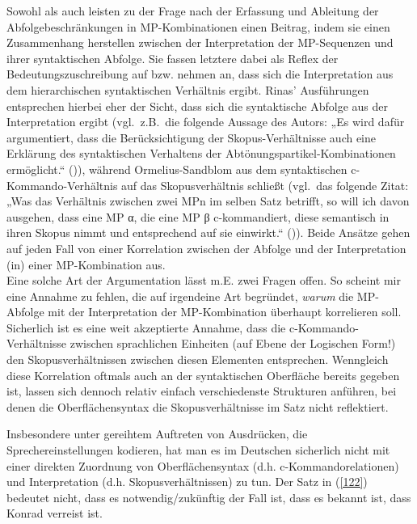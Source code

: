 \noindent 
Sowohl \citet{Ormelius-Sandblom1997} als auch \citet{Rinas2006, Rinas2007} leisten zu der Frage nach der Erfassung und Ableitung der Abfolgebeschränkungen in MP-Kom\-bi\-na\-ti\-on\-en einen Beitrag, indem sie einen Zusammenhang herstellen zwischen der Interpretation der MP-Sequenzen und ihrer syntaktischen Abfolge. Sie fassen letztere dabei als Reflex der Bedeutungszuschreibung auf bzw. nehmen an, dass sich die Interpretation aus dem hierarchischen syntaktischen Verhältnis ergibt. Rinas' Ausführungen entsprechen hierbei eher der Sicht, dass sich die syntaktische Abfolge aus der Interpretation ergibt (vgl.\ z.B.\ die folgende Aussage des Autors:  „Es wird dafür argumentiert, dass die Berücksichtigung der Skopus-Verhältnisse  auch eine Erklärung des syntaktischen Verhaltens der Abtönungs\-partikel-Kombinationen ermöglicht.“ (\citealt[408]{Rinas2007})), während Ormelius-\linebreak Sandblom aus dem syntaktischen c-Kommando-Verhältnis  auf das Skopusverhältnis schließt (vgl.\ das folgende Zitat:  „Was das Verhältnis zwischen zwei MPn im selben Satz betrifft, so will ich davon ausgehen, dass eine MP α, die eine MP β c-kommandiert, diese semantisch in ihren Skopus nimmt und entsprechend auf sie einwirkt.“ (\citealt[92--93]{Ormelius-Sandblom1997})). Beide Ansätze gehen auf jeden Fall von einer Korrelation zwischen der Abfolge und der Interpretation (in) einer MP-Kombinati\-on aus.\\

\noindent
Eine solche Art der Argumentation lässt m.E. zwei Fragen offen. So scheint mir eine Annahme zu fehlen, die auf irgendeine Art begründet, \emph{warum} die MP-Abfolge mit der Interpretation der MP-Kombination überhaupt korrelieren soll. Sicherlich ist es eine weit akzeptierte Annahme, dass die c-Kommando-Verhältnis\-se zwischen sprachlichen Einheiten (auf Ebene der Logischen Form!)  den Skopusverhältnissen zwischen diesen Elementen entsprechen. Wenngleich diese Korrelation oftmals auch an der syntaktischen Oberfläche bereits gegeben ist, lassen sich dennoch relativ einfach verschiedenste Strukturen anführen, bei denen die Oberflächensyntax die Skopusverhältnisse im Satz nicht reflektiert.

Insbesondere unter gereihtem Auftreten von Ausdrücken, die Sprechereinstellungen kodieren, hat man es im Deutschen sicherlich nicht mit einer direkten Zuordnung von Oberflächensyntax (d.h. c-Kommandorelationen) und Interpretation (d.h. Skopusverhältnissen) zu tun. Der Satz in (\ref{122}) bedeutet nicht, dass es notwendig/zukünftig der Fall ist, dass es bekannt ist, dass Konrad verreist ist.

